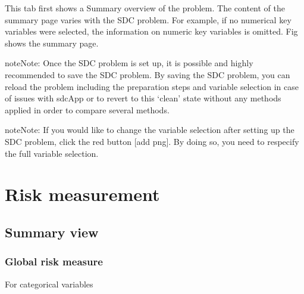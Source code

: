 \documentclass[letterpaper,10pt,english]{sphinxmanual}
\begin{document}
This tab first shows a Summary overview of the problem. The content of the summary page varies with
the SDC problem. For example, if no numerical key variables were selected, the information on
numeric key variables is omitted. Fig shows the summary page.

\begin{sphinxadmonition}{note}{Note:}
Once the SDC problem is set up, it is possible and highly recommended to save
the SDC problem. By saving the SDC problem, you can reload the problem including
the preparation steps and variable selection in case of issues with sdcApp or
to revert to this ‘clean’ state without any methods applied in order to compare several
methods.
\end{sphinxadmonition}

\begin{sphinxadmonition}{note}{Note:}
If you would like to change the variable selection after setting up the SDC problem,
click the red button {[}add png{]}. By doing so, you need to respecify the full variable selection.
\end{sphinxadmonition}


\chapter{Risk measurement}
\label{\detokenize{risk::doc}}\label{\detokenize{risk:risk-measurement}}

\section{Summary view}
\label{\detokenize{risk:summary-view}}

\subsection{Global risk measure}
\label{\detokenize{risk:global-risk-measure}}
For categorical variables
\end{document}
